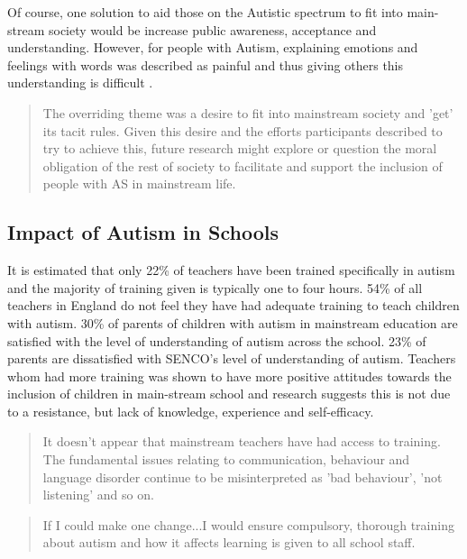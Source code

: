\documentclass[11pt]{report}
\begin{document}
Of course, one solution to aid those on the Autistic spectrum to fit into main-stream society would be increase public awareness, acceptance and understanding. However, for people with Autism, explaining emotions and feelings with words was described as painful and thus giving others this understanding is difficult \cite{aspieway}. 

\begin{quote}
The overriding theme was a desire to fit into mainstream society and 'get' its tacit rules. Given this desire and the
efforts participants described to try to achieve this, future research might explore or question the moral obligation of the rest of society to facilitate and support the inclusion of people with AS in mainstream life. \cite{aspieway}
\end{quote}

\subsection{Impact of Autism in Schools}
It is estimated that only 22\% of teachers have been trained specifically in autism and the majority of training given is typically one to four hours\cite{nasschool}. 54\% of all teachers in England do not feel they have had adequate training to teach children with autism.\cite{statsandfacts} 30\% of parents of children with autism in mainstream education are satisfied with the level of understanding of autism across the school\cite{nasschool}. 23\% of parents are dissatisfied with SENCO's level of understanding of autism. Teachers whom had more training was shown to have more positive attitudes towards the inclusion of children in main-stream school and research suggests this is not due to a resistance, but lack of knowledge, experience and self-efficacy\cite{teachersinclusion}.

\begin{quote}
It doesn't appear that mainstream teachers have had access to training. The fundamental issues relating to communication, behaviour and language disorder continue to be misinterpreted as 'bad behaviour', 'not listening' and so on.\cite{nasschool}
\end{quote}

\begin{quote}
If I could make one change...I would ensure compulsory, thorough training about autism and how it affects learning is given to all school staff. \cite{nasschool}
\end{quote}
\end{document}

